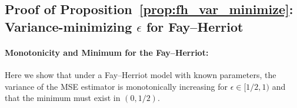 \documentclass[11pt]{article}
\theoremstyle{plain}
\theoremstyle{definition}
\theoremstyle{remark}
\begin{document}

\subsection{
  Proof of Proposition~\ref{prop:fh_var_minimize}:
  Variance-minimizing
  \texorpdfstring{$\epsilon$}{epsilon}
  for Fay--Herriot
}\label{app:fh_var_minimize}
\paragraph{Monotonicity and Minimum for the Fay--Herriot:}
Here we show that under a Fay--Herriot model with known parameters, the variance of the MSE estimator is monotonically increasing for $\epsilon \in [1/2, 1)$ and that the minimum must exist in $(0, 1/2)$.
\end{document}
